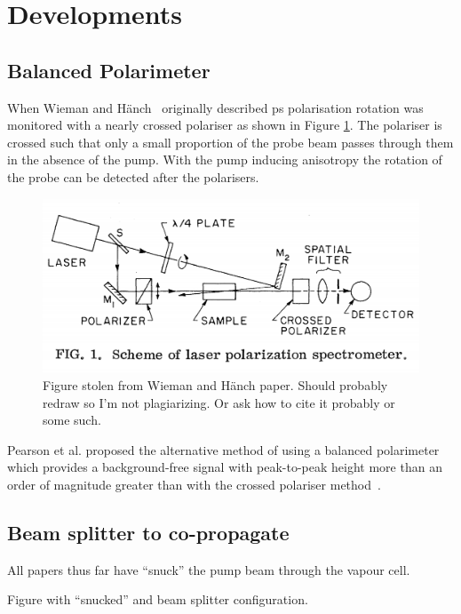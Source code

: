 \section{Developments}

\subsection{Balanced Polarimeter}
When Wieman and H\"anch~\cite{wieman_doppler-free_1976} originally described \gls{ps} polarisation rotation was monitored with a nearly crossed polariser as shown in Figure \ref{figure:wieman_doppler-free_schematic}.
The polariser is crossed such that only a small proportion of the probe beam passes through them in the absence of the pump.
With the pump inducing anisotropy the rotation of the probe can be detected after the polarisers.

\begin{figure}
\includegraphics[width=\linewidth]{part1/Figs/wieman_doppler-free_schematic.png}
\caption{Figure stolen from Wieman and H\"anch paper.
Should probably redraw so I'm not plagiarizing.
Or ask how to cite it probably or some such.}
\label{figure:wieman_doppler-free_schematic}
\end{figure}

Pearson et al. proposed the alternative method of using a balanced polarimeter which provides a background-free signal with peak-to-peak height more than an order of magnitude greater than with the crossed polariser method~\cite{pearman_polarization_2002}.

\subsection{Beam splitter to co-propagate}

All papers thus far have ``snuck'' the pump beam through the vapour cell.

Figure with ``snucked'' and beam splitter configuration.

